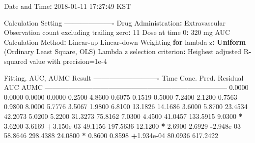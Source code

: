 \documentclass[12pt,]{krantz}
\newenvironment{Shaded}{\begin{snugshade}}{\end{snugshade}}
\newcommand{\KeywordTok}[1]{\textcolor[rgb]{0.13,0.29,0.53}{\textbf{#1}}}
\newcommand{\DecValTok}[1]{\textcolor[rgb]{0.00,0.00,0.81}{#1}}
\newcommand{\FloatTok}[1]{\textcolor[rgb]{0.00,0.00,0.81}{#1}}
\newcommand{\StringTok}[1]{\textcolor[rgb]{0.31,0.60,0.02}{#1}}
\newcommand{\ControlFlowTok}[1]{\textcolor[rgb]{0.13,0.29,0.53}{\textbf{#1}}}
\newcommand{\OperatorTok}[1]{\textcolor[rgb]{0.81,0.36,0.00}{\textbf{#1}}}
\newcommand{\NormalTok}[1]{#1}
\theoremstyle{definition}
\theoremstyle{definition}
\theoremstyle{definition}
\theoremstyle{remark}
\begin{document}
\begin{Shaded}
\begin{Highlighting}[]
{{{{{{{{{{{{\NormalTok{Date and Time}\OperatorTok{:}\StringTok{ }\DecValTok{2018}\OperatorTok{-}\DecValTok{01}\OperatorTok{-}\DecValTok{11} \DecValTok{17}\OperatorTok{:}\DecValTok{27}\OperatorTok{:}\DecValTok{49}\NormalTok{ KST}

\NormalTok{Calculation Setting}
\OperatorTok{-------------------}
\NormalTok{Drug Administration}\OperatorTok{:}\StringTok{ }\NormalTok{Extravascular}
\NormalTok{Observation count excluding trailing zero}\OperatorTok{:}\StringTok{ }\DecValTok{11}
\NormalTok{Dose at time }\DecValTok{0}\OperatorTok{:}\StringTok{ }\DecValTok{320}\NormalTok{ mg}
\NormalTok{AUC Calculation Method}\OperatorTok{:}\StringTok{ }\NormalTok{Linear}\OperatorTok{-}\NormalTok{up Linear}\OperatorTok{-}\NormalTok{down}
\NormalTok{Weighting }\ControlFlowTok{for}\NormalTok{ lambda z}\OperatorTok{:}\StringTok{ }\KeywordTok{Uniform}\NormalTok{ (Ordinary Least Square, OLS)}
\NormalTok{Lambda z selection criterion}\OperatorTok{:}\StringTok{ }\NormalTok{Heighest adjusted R}\OperatorTok{-}\NormalTok{squared value with precision=}\FloatTok{1e-4}


\NormalTok{Fitting, AUC, AUMC Result}
\OperatorTok{-------------------------}
\StringTok{      }\NormalTok{Time         Conc.      Pred.   Residual       AUC       AUMC}
\OperatorTok{---------------------------------------------------------------------}
\StringTok{     }\FloatTok{0.0000}       \FloatTok{0.0000}                           \FloatTok{0.0000}     \FloatTok{0.0000}
     \FloatTok{0.2500}       \FloatTok{4.8600}                           \FloatTok{0.6075}     \FloatTok{0.1519}
     \FloatTok{0.5000}       \FloatTok{7.2400}                           \FloatTok{2.1200}     \FloatTok{0.7563}
     \FloatTok{0.9800}       \FloatTok{8.0000}                           \FloatTok{5.7776}     \FloatTok{3.5067}
     \FloatTok{1.9800}       \FloatTok{6.8100}                          \FloatTok{13.1826}    \FloatTok{14.1686}
     \FloatTok{3.6000}       \FloatTok{5.8700}                          \FloatTok{23.4534}    \FloatTok{42.2073}
     \FloatTok{5.0200}       \FloatTok{5.2200}                          \FloatTok{31.3273}    \FloatTok{75.8162}
     \FloatTok{7.0300}       \FloatTok{4.4500}                          \FloatTok{41.0457}   \FloatTok{133.5915}
     \FloatTok{9.0300} \OperatorTok{*}\StringTok{     }\FloatTok{3.6200}     \FloatTok{3.6169} \OperatorTok{+}\FloatTok{3.150e-03}    \FloatTok{49.1156}   \FloatTok{197.5636}
    \FloatTok{12.1200} \OperatorTok{*}\StringTok{     }\FloatTok{2.6900}     \FloatTok{2.6929} \OperatorTok{-}\FloatTok{2.948e-03}    \FloatTok{58.8646}   \FloatTok{298.4388}
    \FloatTok{24.0800} \OperatorTok{*}\StringTok{     }\FloatTok{0.8600}     \FloatTok{0.8598} \OperatorTok{+}\FloatTok{1.934e-04}    \FloatTok{80.0936}   \FloatTok{617.2422}

}}}}}}}}}}}}
\end{Highlighting}
\end{Shaded}
\end{document}
